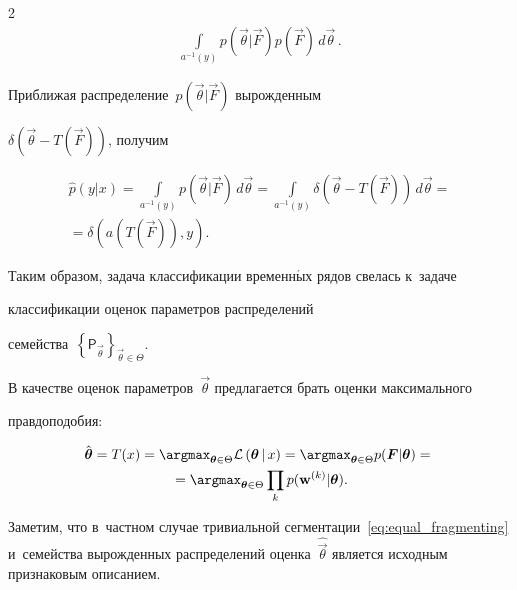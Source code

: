 \begin{multicols}{2}
\begin{multline*}
\int\limits_{a^{-1}(y)}\!p\left(\vec\theta|\vec{F}\right)p\left(\vec{F}\right)\,d\vec\theta\,.


\end{multline*}


Приближая распределение~$p(\vec\theta|\vec{F})$ вырожденным 


$\delta(\vec\theta-T(\vec{F}))$, получим


\begin{multline*}


\hat{p}(y|x)=


\!\int\limits_{a^{-1}(y)}\!\!\! \!p\left(\vec\theta|\vec{F}\right)\,d\vec\theta=


\!\int\limits_{a^{-1}(y)}\!\!\!\!\delta\left(\vec\theta-T\left(\vec{F}\right)\right)\,


d\vec\theta={}\\


{}=


\delta\left(a(T(\vec{F})),y\right).


\end{multline*}


Таким образом, задача классификации временн$\acute{\mbox{ы}}$х рядов свелась к~задаче 


классификации оценок параметров распределений 


семейства~$\left\{\mathsf{P}_{\vec\theta}\right\}_{\vec\theta\in \Theta}$.





В качестве оценок параметров~$\vec\theta$ предлагается брать оценки максимального 


правдоподобия:


\begin{multline*}


\hat{\vec\theta}=


T(x)=


\argmax_{\vec\theta\in\Theta}\mathcal{L}\left(\vec\theta\,|\,x\right)=


\argmax_{\vec\theta\in\Theta}p(\vec{F}|\vec\theta)={}\\


{}=


\argmax_{\vec\theta\in\Theta}\prod_{k}p(\mathbf{w}^{(k)}|\vec\theta).


\end{multline*}





Заметим, что в~частном случае тривиальной сегментации~\eqref{eq:equal_fragmenting} и~семейства вырожденных распределений оценка~$\hat{\vec\theta}$ является исходным признаковым описанием.



\end{multicols}
